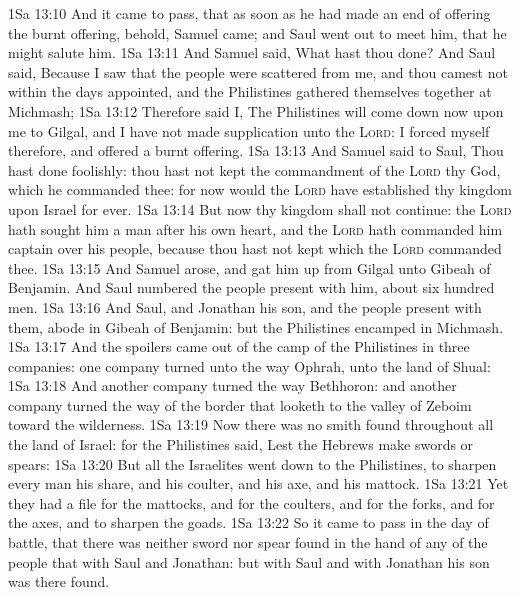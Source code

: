 \vs 1Sa 13:10 And it came to pass, that as soon as he had made an end of offering the burnt offering, behold, Samuel came; and Saul went out to meet him, that he might salute him.
\vs 1Sa 13:11 And Samuel said, What hast thou done? And Saul said, Because I saw that the people were scattered from me, and  thou camest not within the days appointed, and  the Philistines gathered themselves together at Michmash;
\vs 1Sa 13:12 Therefore said I, The Philistines will come down now upon me to Gilgal, and I have not made supplication unto the \textsc{Lord}: I forced myself therefore, and offered a burnt offering.
\vs 1Sa 13:13 And Samuel said to Saul, Thou hast done foolishly: thou hast not kept the commandment of the \textsc{Lord} thy God, which he commanded thee: for now would the \textsc{Lord} have established thy kingdom upon Israel for ever.
\vs 1Sa 13:14 But now thy kingdom shall not continue: the \textsc{Lord} hath sought him a man after his own heart, and the \textsc{Lord} hath commanded him  captain over his people, because thou hast not kept  which the \textsc{Lord} commanded thee.
\vs 1Sa 13:15 And Samuel arose, and gat him up from Gilgal unto Gibeah of Benjamin. And Saul numbered the people  present with him, about six hundred men.
\vs 1Sa 13:16 And Saul, and Jonathan his son, and the people  present with them, abode in Gibeah of Benjamin: but the Philistines encamped in Michmash.
\vs 1Sa 13:17 And the spoilers came out of the camp of the Philistines in three companies: one company turned unto the way  Ophrah, unto the land of Shual:
\vs 1Sa 13:18 And another company turned the way  Bethhoron: and another company turned  the way of the border that looketh to the valley of Zeboim toward the wilderness.
\vs 1Sa 13:19 Now there was no smith found throughout all the land of Israel: for the Philistines said, Lest the Hebrews make  swords or spears:
\vs 1Sa 13:20 But all the Israelites went down to the Philistines, to sharpen every man his share, and his coulter, and his axe, and his mattock.
\vs 1Sa 13:21 Yet they had a file for the mattocks, and for the coulters, and for the forks, and for the axes, and to sharpen the goads.
\vs 1Sa 13:22 So it came to pass in the day of battle, that there was neither sword nor spear found in the hand of any of the people that  with Saul and Jonathan: but with Saul and with Jonathan his son was there found.
